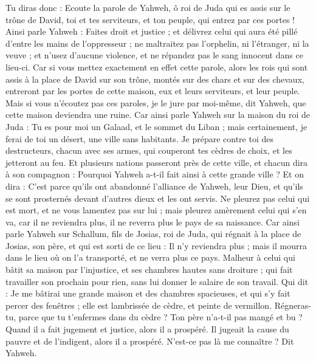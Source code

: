 \begin{multicols}{2}
Tu diras donc : Ecoute la parole de Yahweh, ô roi de Juda qui es assis sur le trône de David, toi et tes serviteurs, et ton peuple, qui entrez par ces portes !
Ainsi parle Yahweh : Faites droit et justice ; et délivrez celui qui aura été pillé d'entre les mains de l'oppresseur ; ne maltraitez pas l'orphelin, ni l'étranger, ni la veuve ; et n'usez d'aucune violence, et ne répandez pas le sang innocent dans ce lieu-ci.
Car si vous mettez exactement en effet cette parole, alors les rois qui sont assis à la place de David sur son trône, montés sur des chars et sur des chevaux, entreront par les portes de cette maison, eux et leurs serviteurs, et leur peuple.
Mais si vous n'écoutez pas ces paroles, je le jure par moi-même, dit Yahweh, que cette maison deviendra une ruine.
Car ainsi parle Yahweh sur la maison du roi de Juda : Tu es pour moi un Galaad, et le sommet du Liban ; mais certainement, je ferai de toi un désert, une ville sans habitants.
Je prépare contre toi des destructeurs, chacun avec ses armes, qui couperont tes cèdres de choix, et les jetteront au feu.
Et plusieurs nations passeront près de cette ville, et chacun dira à son compagnon : Pourquoi Yahweh a-t-il fait ainsi à cette grande ville ?
Et on dira : C'est parce qu'ils ont abandonné l'alliance de Yahweh, leur Dieu, et qu'ils se sont prosternés devant d'autres dieux et les ont servis.
Ne pleurez pas celui qui est mort, et ne vous lamentez pas sur lui ; mais pleurez amèrement celui qui s'en va, car il ne reviendra plus, il ne reverra plus le pays de sa naissance.
Car ainsi parle Yahweh sur Schallum, fils de Josias, roi de Juda, qui régnait à la place de Josias, son père, et qui est sorti de ce lieu : Il n'y reviendra plus ;
mais il mourra dans le lieu où on l'a transporté, et ne verra plus ce pays.
Malheur à celui qui bâtit sa maison par l'injustice, et ses chambres hautes sans droiture ; qui fait travailler son prochain pour rien, sans lui donner le salaire de son travail.
Qui dit : Je me bâtirai une grande maison et des chambres spacieuses, et qui s'y fait percer des fenêtres ; elle est lambrissée de cèdre, et peinte de vermillon.
Régneras-tu, parce que tu t’enfermes dans du cèdre ? Ton père n'a-t-il pas mangé et bu ? Quand il a fait jugement et justice, alors il a prospéré.
Il jugeait la cause du pauvre et de l'indigent, alors il a prospéré. N'est-ce pas là me connaître ? Dit Yahweh.

\end{multicols}

